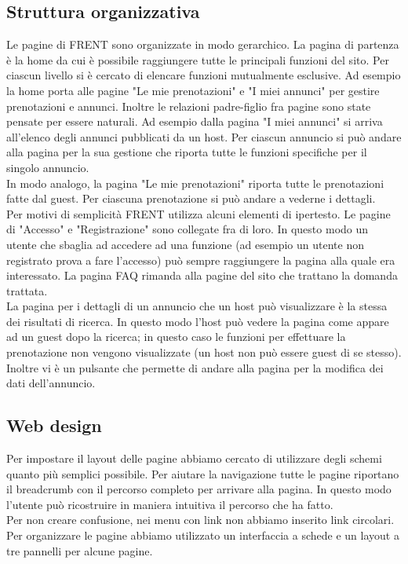 \documentclass[1_relazione.tex]{subfiles}
\begin{document}
    \subsection{Struttura organizzativa}
    Le pagine di FRENT sono organizzate in modo gerarchico. La pagina di partenza \`{e} la home da cui \`{e} possibile raggiungere tutte le principali funzioni del sito. Per ciascun livello si \`{e} cercato di elencare funzioni mutualmente esclusive. Ad esempio la home porta alle pagine "Le mie prenotazioni" e "I miei annunci" per gestire prenotazioni e annunci. Inoltre le relazioni padre-figlio fra pagine sono state pensate per essere naturali. Ad esempio dalla pagina "I miei annunci" si arriva all'elenco degli annunci pubblicati da un host. Per ciascun annuncio si pu\`{o} andare alla pagina per la sua gestione che riporta tutte le funzioni specifiche per il singolo annuncio.\\In modo analogo, la pagina "Le mie prenotazioni" riporta tutte le prenotazioni fatte dal guest. Per ciascuna prenotazione si pu\`{o} andare a vederne i dettagli. \\
    Per motivi di semplicit\`{a} FRENT utilizza alcuni elementi di ipertesto. Le pagine di "Accesso" e "Registrazione" sono collegate fra di loro. In questo modo un utente che sbaglia ad accedere ad una funzione (ad esempio un utente non registrato prova a fare l'accesso) può sempre raggiungere la pagina alla quale era interessato. La pagina FAQ rimanda alla pagine del sito che trattano la domanda trattata. \\
    La pagina per i dettagli di un annuncio che un host pu\`{o} visualizzare \`{e} la stessa dei risultati di ricerca. In questo modo l'host pu\`{o} vedere la pagina come appare ad un guest dopo la ricerca; in questo caso le funzioni per effettuare la prenotazione non vengono visualizzate (un host non pu\`{o} essere guest di se stesso). Inoltre vi \`{e} un pulsante che permette di andare alla pagina per la modifica dei dati dell'annuncio.

    \subsection{Web design}
    Per impostare il layout delle pagine abbiamo cercato di utilizzare degli schemi quanto pi\`{u} semplici possibile. Per aiutare la navigazione tutte le pagine riportano il breadcrumb con il percorso completo per arrivare alla pagina. In questo modo l'utente pu\`{o} ricostruire in maniera intuitiva il percorso che ha fatto.\\ Per non creare confusione, nei menu con link non abbiamo inserito link circolari. \\
    Per organizzare le pagine abbiamo utilizzato un interfaccia a schede e un layout a tre pannelli per alcune pagine.
\end{document}

